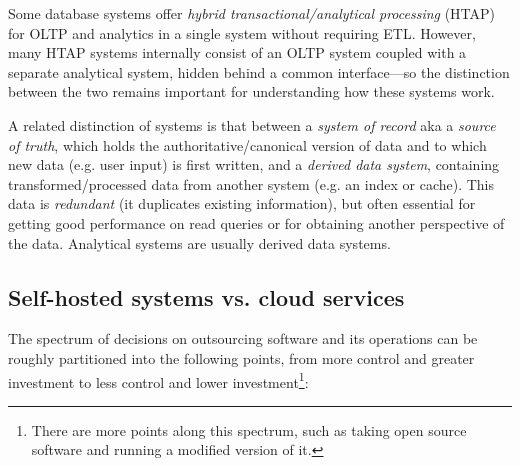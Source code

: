 \documentclass[table, xcdraw]{article}%
\begin{document}
Some database systems offer \textit{hybrid transactional/analytical processing} (HTAP) for OLTP and analytics in a single system without requiring ETL. However, many HTAP systems internally consist of an OLTP system coupled with a separate analytical system, hidden behind a common interface—so the distinction between the two remains important for understanding how these systems work.

A related distinction of systems is that between a \textit{system of record} aka a \textit{source of truth}, which holds the authoritative/canonical version of data and to which new data (e.g. user input) is first written, and a \textit{derived data system}, containing transformed/processed data from another system (e.g. an index or cache). This data is \textit{redundant} (it duplicates existing information), but often essential for getting good performance on read queries or for obtaining another perspective of the data. Analytical systems are usually derived data systems.

\subsection{Self-hosted systems vs. cloud services}

The spectrum of decisions on outsourcing software and its operations can be roughly partitioned into the following points, from more control and greater investment to less control and lower investment\footnote{There are more points along this spectrum, such as taking open source software and running a modified version of it.}:
\end{document}
